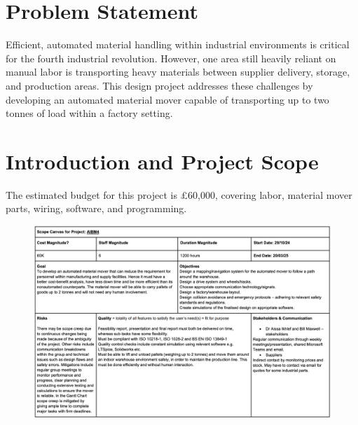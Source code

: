\documentclass[12pt]{article}
\begin{document}
\tableofcontents
\newpage


\section{Problem Statement}
Efficient, automated material handling within industrial environments is critical for the fourth industrial revolution. However, one area still heavily reliant on manual labor is transporting heavy materials between supplier delivery, storage, and production areas. This design project addresses these challenges by developing an automated material mover capable of transporting up to two tonnes of load within a factory setting.


\section{Introduction and Project Scope}
The estimated budget for this project is £60,000, covering labor, material mover parts, wiring, software, and programming.


\begin{figure}[h!]
    \centering
    \includegraphics[width=1\textwidth]{scope1.png}
  \label{fig:Project Scope Document for AIBM4}
\end{figure}
\end{document}
